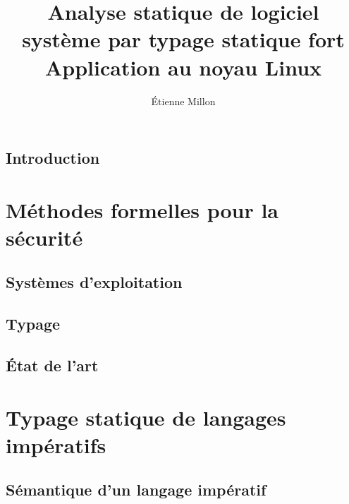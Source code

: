 \documentclass[a4paper,11pt]{memoir}
\title{ \bfseries\LARGE Analyse statique de logiciel système par typage statique fort\\%
      {\mdseries\Large Application au noyau Linux}}
\author{Étienne Millon}
\begin{document}
\frontmatter

\maketitle

\cleartorecto

\asuabstract



\asuacknowledgements




\tableofcontents

\mainmatter

\chapter{Introduction}


\part{Méthodes formelles pour la sécurité}

\chapter{Systèmes d'exploitation}

\label{cha:os}


\chapter{Typage}



\chapter{État de l'art}



\part{Typage statique de langages impératifs}

\chapter{Sémantique d'un langage impératif}
\end{document}
